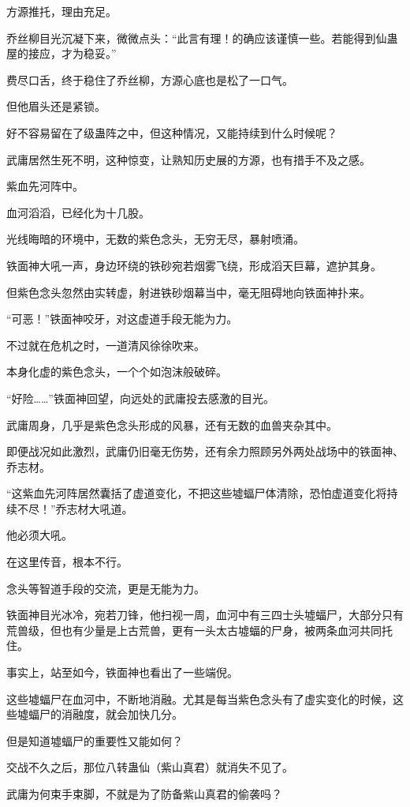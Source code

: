 \begin{this_body}
方源推托，理由充足。

乔丝柳目光沉凝下来，微微点头：“此言有理！的确应该谨慎一些。若能得到仙蛊屋的接应，才为稳妥。”

费尽口舌，终于稳住了乔丝柳，方源心底也是松了一口气。

但他眉头还是紧锁。

好不容易留在了级蛊阵之中，但这种情况，又能持续到什么时候呢？

武庸居然生死不明，这种惊变，让熟知历史展的方源，也有措手不及之感。

紫血先河阵中。

血河滔滔，已经化为十几股。

光线晦暗的环境中，无数的紫色念头，无穷无尽，暴射喷涌。

铁面神大吼一声，身边环绕的铁砂宛若烟雾飞绕，形成滔天巨幕，遮护其身。

但紫色念头忽然由实转虚，射进铁砂烟幕当中，毫无阻碍地向铁面神扑来。

“可恶！”铁面神咬牙，对这虚道手段无能为力。

不过就在危机之时，一道清风徐徐吹来。

本身化虚的紫色念头，一个个如泡沫般破碎。

“好险……”铁面神回望，向远处的武庸投去感激的目光。

武庸周身，几乎是紫色念头形成的风暴，还有无数的血兽夹杂其中。

即便战况如此激烈，武庸仍旧毫无伤势，还有余力照顾另外两处战场中的铁面神、乔志材。

“这紫血先河阵居然囊括了虚道变化，不把这些墟蝠尸体清除，恐怕虚道变化将持续不尽！”乔志材大吼道。

他必须大吼。

在这里传音，根本不行。

念头等智道手段的交流，更是无能为力。

铁面神目光冰冷，宛若刀锋，他扫视一周，血河中有三四士头墟蝠尸，大部分只有荒兽级，但也有少量是上古荒兽，更有一头太古墟蝠的尸身，被两条血河共同托住。

事实上，站至如今，铁面神也看出了一些端倪。

这些墟蝠尸在血河中，不断地消融。尤其是每当紫色念头有了虚实变化的时候，这些墟蝠尸的消融度，就会加快几分。

但是知道墟蝠尸的重要性又能如何？

交战不久之后，那位八转蛊仙（紫山真君）就消失不见了。

武庸为何束手束脚，不就是为了防备紫山真君的偷袭吗？


\end{this_body}
